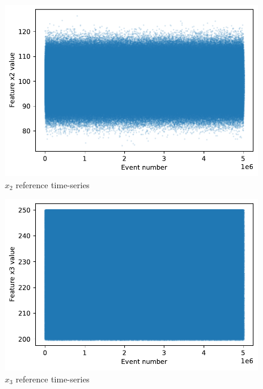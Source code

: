 \documentclass[sigconf]{acmart}
\begin{document}
\begin{figure}[!htb]
    \begin{center}
      \includegraphics[scale=0.5]{figures/timeseries-r6-x2.pdf} 
      \caption{$x_2$ reference time-series} 
      \label{fig:timeseries-r6-x2} 
    \end{center}
\end{figure}
\begin{figure}[!htb]
    \begin{center}
      \includegraphics[scale=0.5]{figures/timeseries-r6-x3.pdf} 
      \caption{$x_3$ reference time-series} 
      \label{fig:timeseries-r6-x3} 
    \end{center}
\end{figure}
\end{document}
